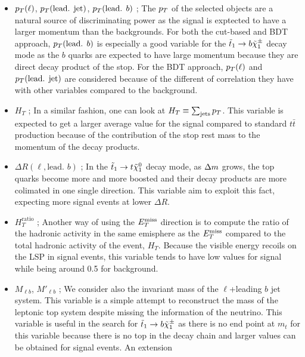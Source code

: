     \begin{itemize}
        \item $p_T(\ell)$, $p_T(\text{lead. jet})$, $p_T(\text{lead. } b)$ ; The $p_T$ of the
            selected objects are a natural source of discriminating power as the signal is exptected
            to have a larger momentum than the backgrounds. For both the cut-based and BDT approach,
            $p_T(\text{lead. } b)$ is especially a good variable for the $\tilde{t}_1 \rightarrow b \tilde{\chi}_1^\pm$
            decay mode as the $b$ quarks are expected to have large momentum because they are direct
            decay product of the stop. For the BDT approach, $p_T(\ell)$ and $p_T(\text{lead. jet})$
            are considered because of the different of correlation they have with other variables
            compared to the background.
        \item $H_T$ ; In a similar fashion, one can look at $H_T \equiv \sum_{\text{jets}} p_T$.
            This variable is expected to get a larger average value for the signal compared to standard
            $t\bar{t}$ production because of the contribution of the stop rest mass to the momentum of
            the decay products.
        \item $\Delta R( \ell, \text{lead. } b)$ ; In the $\tilde{t}_1 \rightarrow t \tilde{\chi}_1^0$ decay mode,
            as $\Delta m$ grows, the top quarks become more and more boosted and their decay products are
            more colimated in one single direction. This variable aim to exploit this fact, expecting more
            signal events at lower $\Delta R$. 
        \item $H_{T}^\text{ratio}$ ; Another way of using the $E_T^\text{miss}$ direction is to compute the ratio of the
            hadronic activity in the same emisphere as the $E_T^\text{miss}$ compared to the total hadronic activity of the event,
            $H_T$. Because the visible energy recoils on the LSP in signal events, this variable tends to have
            low values for signal while being around 0.5 for background.
        \item $M_{\ell b}$, $M'_{\ell b}$ ; We consider also the invariant mass of the $\ell$+leading $b$ jet system. This variable
            is a simple attempt to reconstruct the mass of the leptonic top system despite missing
            the information of the neutrino. This variable is useful in the search for $\tilde{t}_1 \rightarrow
            b \tilde{\chi}_1^\pm$ as there is no end point at $m_t$ for this variable because there is no
            top in the decay chain and larger values can be obtained for signal events. An extension

\end{itemize}
